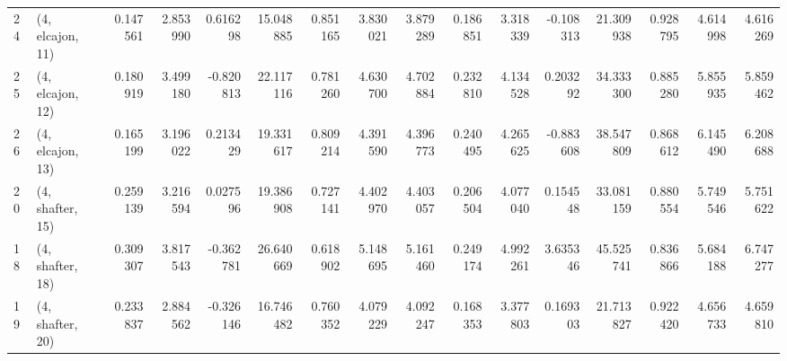 \begin{tabular}{llrrrrrrrrrrrrrr}
24 &  (4, elcajon, 11) &   0.147561 &  2.853990 &  0.616298 &  15.048885 &  0.851165 &   3.830021 &  3.879289 &  0.186851 &  3.318339 & -0.108313 &   21.309938 &  0.928795 &   4.614998 &   4.616269 \\
25 &  (4, elcajon, 12) &   0.180919 &  3.499180 & -0.820813 &  22.117116 &  0.781260 &   4.630700 &  4.702884 &  0.232810 &  4.134528 &  0.203292 &   34.333300 &  0.885280 &   5.855935 &   5.859462 \\
26 &  (4, elcajon, 13) &   0.165199 &  3.196022 &  0.213429 &  19.331617 &  0.809214 &   4.391590 &  4.396773 &  0.240495 &  4.265625 & -0.883608 &   38.547809 &  0.868612 &   6.145490 &   6.208688 \\
20 &  (4, shafter, 15) &   0.259139 &  3.216594 &  0.027596 &  19.386908 &  0.727141 &   4.402970 &  4.403057 &  0.206504 &  4.077040 &  0.154548 &   33.081159 &  0.880554 &   5.749546 &   5.751622 \\
18 &  (4, shafter, 18) &   0.309307 &  3.817543 & -0.362781 &  26.640669 &  0.618902 &   5.148695 &  5.161460 &  0.249174 &  4.992261 &  3.635346 &   45.525741 &  0.836866 &   5.684188 &   6.747277 \\
19 &  (4, shafter, 20) &   0.233837 &  2.884562 & -0.326146 &  16.746482 &  0.760352 &   4.079229 &  4.092247 &  0.168353 &  3.377803 &  0.169303 &   21.713827 &  0.922420 &   4.656733 &   4.659810 \\
\bottomrule
\end{tabular}

